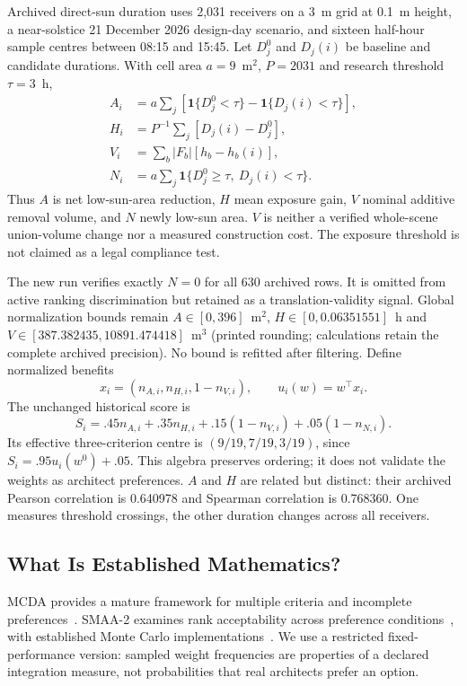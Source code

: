 \documentclass{llncs}
\newcommand{\ind}{\mathbf{1}}
\begin{document}
Archived direct-sun duration uses 2,031 receivers on a 3~m grid at 0.1~m height, a near-solstice 21 December 2026 design-day scenario, and sixteen half-hour sample centres between 08:15 and 15:45. Let $D_j^0$ and $D_j(i)$ be baseline and candidate durations. With cell area $a=9$~m$^2$, $P=2031$ and research threshold $\tau=3$~h,
\begin{align}
 A_i&=a\sum_j[\ind\{D_j^0<\tau\}-\ind\{D_j(i)<\tau\}],\\
 H_i&=P^{-1}\sum_j[D_j(i)-D_j^0],\\
 V_i&=\sum_b |F_b|[h_b-h_b(i)],\\
 N_i&=a\sum_j\ind\{D_j^0\geq\tau,\ D_j(i)<\tau\}.
\end{align}
Thus $A$ is net low-sun-area reduction, $H$ mean exposure gain, $V$ nominal additive removal volume, and $N$ newly low-sun area. $V$ is neither a verified whole-scene union-volume change nor a measured construction cost. The exposure threshold is not claimed as a legal compliance test.

The new run verifies exactly $N=0$ for all 630 archived rows. It is omitted from active ranking discrimination but retained as a translation-validity signal. Global normalization bounds remain $A\in[0,396]$~m$^2$, $H\in[0,0.06351551]$~h and $V\in[387.382435,10891.474418]$~m$^3$ (printed rounding; calculations retain the complete archived precision). No bound is refitted after filtering. Define normalized benefits
\begin{equation}
 x_i=(n_{A,i},n_{H,i},1-n_{V,i}),\qquad u_i(w)=w^\top x_i.
\end{equation}
The unchanged historical score is
\begin{equation}
 S_i=.45n_{A,i}+.35n_{H,i}+.15(1-n_{V,i})+.05(1-n_{N,i}).
\end{equation}
Its effective three-criterion centre is $(9/19,7/19,3/19)$, since $S_i=.95u_i(w^0)+.05$. This algebra preserves ordering; it does not validate the weights as architect preferences. $A$ and $H$ are related but distinct: their archived Pearson correlation is 0.640978 and Spearman correlation is 0.768360. One measures threshold crossings, the other duration changes across all receivers.

\subsection{What Is Established Mathematics?}
MCDA provides a mature framework for multiple criteria and incomplete preferences~\cite{GrecoEhrgottFigueira2016}. SMAA-2 examines rank acceptability across preference conditions~\cite{LahdelmaSalminen2001}, with established Monte Carlo implementations~\cite{TervonenLahdelma2007}. We use a restricted fixed-performance version: sampled weight frequencies are properties of a declared integration measure, not probabilities that real architects prefer an option.
\end{document}
